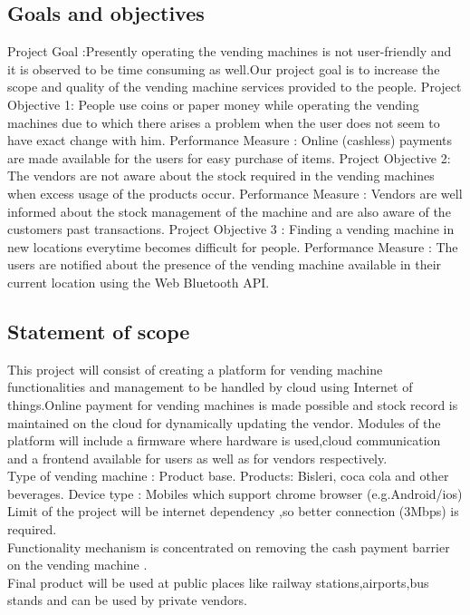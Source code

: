 \documentclass[oneside,a4paper,12pt]{report}
\begin{document}
\subsection{Goals and objectives}  
Project Goal :Presently operating the vending machines is not user-friendly and it is observed to be time consuming as well.Our project goal is to increase the scope and quality of the vending machine services provided to the people. 
Project Objective 1:
People use coins or paper money while operating the vending machines due to which there arises a problem when the user does not seem to have exact change with him.
Performance Measure :
Online (cashless) payments are made available for the users for easy purchase of items.
Project Objective 2:
The vendors are not aware about the stock required in the vending machines when excess usage of the products occur.
Performance Measure :
Vendors are well informed about the stock management of the machine and are also aware of the customers past transactions.
Project Objective 3 :
Finding a vending machine in new locations everytime becomes difficult for people.
Performance Measure :
The users are notified about the presence of the vending machine available in their current location using the Web Bluetooth API.
	
 \subsection{Statement of scope} 
This project will consist of creating a platform for vending machine functionalities and management to be  handled by cloud using Internet of things.Online payment for vending machines is made possible and stock record is maintained on the cloud for dynamically updating the vendor. Modules of the platform will include a firmware where hardware is used,cloud communication and a frontend available for users as well as for vendors respectively.\\
Type of vending machine : Product base.
Products: Bisleri,  coca cola and other beverages.
Device type : Mobiles which support chrome browser (e.g.Android/ios)\\
Limit of the project will be internet dependency ,so better connection (3Mbps) is required.\\
Functionality mechanism is concentrated on removing the cash payment barrier on the vending machine .\\
Final product will be used at public places like railway stations,airports,bus stands and can be used by private vendors.\\
\end{document}

